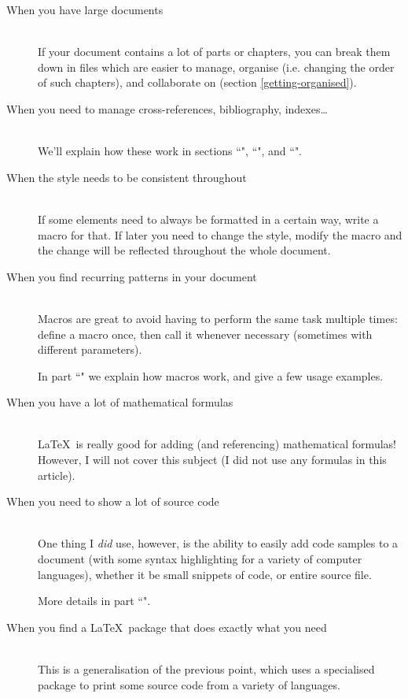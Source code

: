 \begin{description}
	\item[When you have large documents] \mbox{} \\
	If your document contains a lot of parts or chapters, you can break them down in files which are easier to manage, organise (i.e. changing the order of such chapters), and collaborate on (section \ref{getting-organised}).

	\item[When you need to manage cross-references, bibliography, indexes\dots] \mbox{} \\
	We'll explain how these work in sections ``", ``", and ``".
	
	\item[When the style needs to be consistent throughout] \mbox{} \\
	If some elements need to always be formatted in a certain way, write a macro for that. If later you need to change the style, modify the macro and the change will be reflected throughout the whole document.
	
	\item[When you find recurring patterns in your document] \mbox{} \\
	Macros are great to avoid having to perform the same task multiple times: define a macro once, then call it whenever necessary (sometimes with different parameters). 
	
	In part ``" we explain how macros work, and give a few usage examples.
	
	
	\item[When you have a lot of mathematical formulas] \mbox{} \\
	\LaTeX\ is really good for adding (and referencing) mathematical formulas! However, I will not cover this subject (I did not use any formulas in this article).
		
	\item[When you need to show a lot of source code] \mbox{} \\
	One thing I \emph{did} use, however, is the ability to easily add code samples to a document (with some syntax highlighting for a variety of computer languages), whether it be small snippets of code, or entire source file.
	
	More details in part ``".
	
	
	\item[When you find a \LaTeX\ package that does exactly what you need] \mbox{} \\
	This is a generalisation of the previous point, which uses a specialised package to print some source code from a variety of languages.
	

\end{description}
